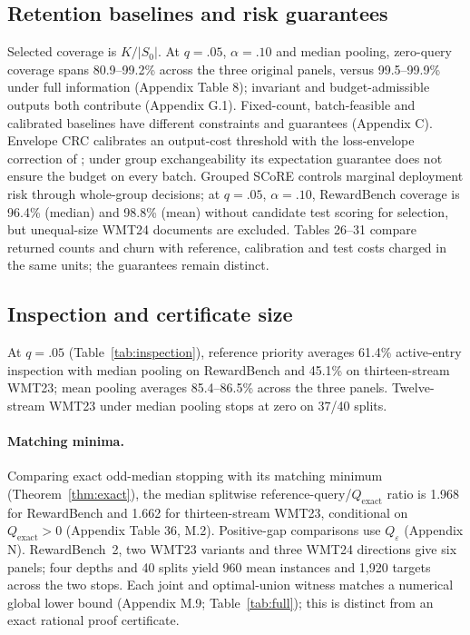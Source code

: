 \documentclass[11pt]{article}
\newcommand{\Qx}{Q_{\mathrm{exact}}}
\newcommand{\Sz}{S_0}
\begin{document}
\subsection{Retention baselines and risk guarantees}
Selected coverage is $K/|\Sz|$. At $q=.05$, $\alpha=.10$ and median pooling, zero-query coverage spans 80.9--99.2\% across the three original panels, versus 99.5--99.9\% under full information (Appendix Table 8); invariant and budget-admissible outputs both contribute (Appendix G.1). Fixed-count, batch-feasible and calibrated baselines have different constraints and guarantees (Appendix C). Envelope CRC calibrates an output-cost threshold with the loss-envelope correction of \citet{yeh2025crt}; under group exchangeability its expectation guarantee does not ensure the budget on every batch. Grouped SCoRE controls marginal deployment risk through whole-group decisions; at $q=.05$, $\alpha=.10$, RewardBench coverage is 96.4\% (median) and 98.8\% (mean) without candidate test scoring for selection, but unequal-size WMT24 documents are excluded. Tables 26--31 compare returned counts and churn with reference, calibration and test costs charged in the same units; the guarantees remain distinct.

\subsection{Inspection and certificate size}
At $q=.05$ (Table~\ref{tab:inspection}), reference priority averages 61.4\% active-entry inspection with median pooling on RewardBench and 45.1\% on thirteen-stream WMT23; mean pooling averages 85.4--86.5\% across the three panels. Twelve-stream WMT23 under median pooling stops at zero on 37/40 splits.

\paragraph{Matching minima.} Comparing exact odd-median stopping with its matching minimum (Theorem~\ref{thm:exact}), the median splitwise reference-query/$\Qx$ ratio is 1.968 for RewardBench and 1.662 for thirteen-stream WMT23, conditional on $\Qx>0$ (Appendix Table 36, M.2). Positive-gap comparisons use $Q_\varepsilon$ (Appendix N). RewardBench~2, two WMT23 variants and three WMT24 directions give six panels; four depths and 40 splits yield 960 mean instances and 1,920 targets across the two stops. Each joint and optimal-union witness matches a numerical global lower bound (Appendix M.9; Table~\ref{tab:full}); this is distinct from an exact rational proof certificate.
\end{document}
